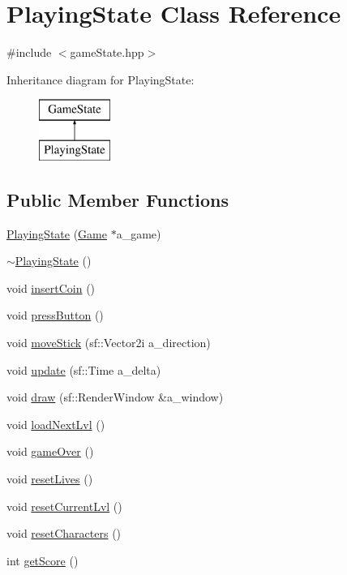 \hypertarget{class_playing_state}{}\section{Playing\+State Class Reference}
\label{class_playing_state}


{\ttfamily \#include $<$game\+State.\+hpp$>$}

Inheritance diagram for Playing\+State\+:\begin{figure}[H]
\begin{center}
\leavevmode
\includegraphics[height=2.000000cm]{class_playing_state}
\end{center}
\end{figure}
\subsection*{Public Member Functions}
\begin{DoxyCompactItemize}
\item 
\hyperlink{class_playing_state_a09c8d3c87687ffa4e5f04c70265d67de}{Playing\+State} (\hyperlink{class_game}{Game} $\ast$a\+\_\+game)
\item 
\hyperlink{class_playing_state_afd96eb2be532e40c9db2f9607e4ea284}{$\sim$\+Playing\+State} ()
\item 
void \hyperlink{class_playing_state_a936d41a2041ace2ccb67a9b779d113a7}{insert\+Coin} ()
\item 
void \hyperlink{class_playing_state_ae59ff244a6cd4a3c6f6fcaef41f4d8c5}{press\+Button} ()
\item 
void \hyperlink{class_playing_state_af205fbb130a2c83b260d80359de914e8}{move\+Stick} (sf\+::\+Vector2i a\+\_\+direction)
\item 
void \hyperlink{class_playing_state_a62b3904b8a971fed2f8fab4eb73bd9e5}{update} (sf\+::\+Time a\+\_\+delta)
\item 
void \hyperlink{class_playing_state_aa6c7033a5c734ba1ae4aae0905554d61}{draw} (sf\+::\+Render\+Window \&a\+\_\+window)
\item 
void \hyperlink{class_playing_state_a18ea22c1b551f6d81d030853f8ce9b73}{load\+Next\+Lvl} ()
\item 
void \hyperlink{class_playing_state_ac2093c243cc85bb767b27797060aab2c}{game\+Over} ()
\item 
void \hyperlink{class_playing_state_a464c879dc893195b041efa58b3b3e73f}{reset\+Lives} ()
\item 
void \hyperlink{class_playing_state_a11a3e0a2d479e659c442deb9c87fdeed}{reset\+Current\+Lvl} ()
\item 
void \hyperlink{class_playing_state_ac1d69f92915e66c4335c6218c0837179}{reset\+Characters} ()
\item 
int \hyperlink{class_playing_state_ab07b1a4993541b38e81f756ac0f4e46b}{get\+Score} ()
\end{DoxyCompactItemize}
